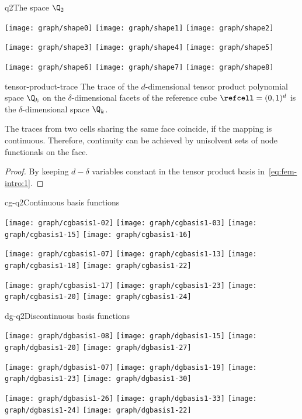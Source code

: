 \begin{Example*}{q2}{The space $\Q_2$}
    \begin{center}
    \texttt{[image: graph/shape0]}
    \texttt{[image: graph/shape1]}
    \texttt{[image: graph/shape2]}

    \texttt{[image: graph/shape3]}
    \texttt{[image: graph/shape4]}
    \texttt{[image: graph/shape5]}

    \texttt{[image: graph/shape6]}
    \texttt{[image: graph/shape7]}
    \texttt{[image: graph/shape8]}
  \end{center}
\end{Example*}


\begin{Lemma}{tensor-product-trace}
  The trace of the $d$-dimensional tensor product polynomial space
  $\Q_k$ on the $\delta$-dimensional facets of the reference cube
  $\refcell = (0,1)^d$ is the $\delta$-dimensional space $\Q_k$.

  The traces from two cells sharing the same face coincide, if the
  mapping is continuous. Therefore, continuity can be achieved by
  unisolvent sets of node functionals on the face.
\end{Lemma}

\begin{proof}
  By keeping $d-\delta$ variables constant in the tensor product basis
  in~\eqref{eq:fem-intro:1}.
\end{proof}

\begin{Example*}{cg-q2}{Continuous basis functions}
  \begin{center}
    \texttt{[image: graph/cgbasis1-02]}
    \texttt{[image: graph/cgbasis1-03]}
    \texttt{[image: graph/cgbasis1-15]}
    \texttt{[image: graph/cgbasis1-16]}

    \texttt{[image: graph/cgbasis1-07]}
    \texttt{[image: graph/cgbasis1-13]}
    \texttt{[image: graph/cgbasis1-18]}
    \texttt{[image: graph/cgbasis1-22]}

    \texttt{[image: graph/cgbasis1-17]}
    \texttt{[image: graph/cgbasis1-23]}
    \texttt{[image: graph/cgbasis1-20]}
    \texttt{[image: graph/cgbasis1-24]}
  \end{center}
\end{Example*}

\begin{Example*}{dg-q2}{Discontinuous basis functions}
  \begin{center}
    \texttt{[image: graph/dgbasis1-08]}
    \texttt{[image: graph/dgbasis1-15]}
    \texttt{[image: graph/dgbasis1-20]}
    \texttt{[image: graph/dgbasis1-27]}

    \texttt{[image: graph/dgbasis1-07]}
    \texttt{[image: graph/dgbasis1-19]}
    \texttt{[image: graph/dgbasis1-23]}
    \texttt{[image: graph/dgbasis1-30]}

    \texttt{[image: graph/dgbasis1-26]}
    \texttt{[image: graph/dgbasis1-33]}
    \texttt{[image: graph/dgbasis1-24]}
    \texttt{[image: graph/dgbasis1-22]}
  \end{center}
\end{Example*}


